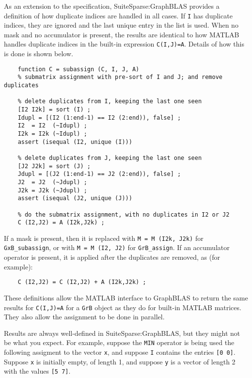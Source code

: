 \documentclass[12pt]{article}
\begin{document}
As an extension to the specification, SuiteSparse:GraphBLAS provides a
definition of how duplicate indices are handled in all cases.  If \verb'I' has
duplicate indices, they are ignored and the last unique entry in the list is
used.  When no mask and no accumulator is present, the results are identical to
how MATLAB handles duplicate indices in the built-in expression
\verb'C(I,J)=A'.  Details of how this is done is shown below.

{\small
\begin{verbatim}
    function C = subassign (C, I, J, A)
    % submatrix assignment with pre-sort of I and J; and remove duplicates

    % delete duplicates from I, keeping the last one seen
    [I2 I2k] = sort (I) ;
    Idupl = [(I2 (1:end-1) == I2 (2:end)), false] ;
    I2  = I2  (~Idupl) ;
    I2k = I2k (~Idupl) ;
    assert (isequal (I2, unique (I)))

    % delete duplicates from J, keeping the last one seen
    [J2 J2k] = sort (J) ;
    Jdupl = [(J2 (1:end-1) == J2 (2:end)), false] ;
    J2  = J2  (~Jdupl) ;
    J2k = J2k (~Jdupl) ;
    assert (isequal (J2, unique (J)))

    % do the submatrix assignment, with no duplicates in I2 or J2
    C (I2,J2) = A (I2k,J2k) ;
\end{verbatim}}

If a mask is present, then it is replaced with \verb'M = M (I2k, J2k)' for
\verb'GxB_subassign', or with \verb'M = M (I2, J2)' for \verb'GrB_assign'.
If an accumulator operator is present, it is applied after the duplicates
are removed, as (for example):

{\small
\begin{verbatim}
    C (I2,J2) = C (I2,J2) + A (I2k,J2k) ;
\end{verbatim}}

These definitions allow the MATLAB interface to GraphBLAS to return the same
results for \verb'C(I,J)=A' for a \verb'GrB' object as they do for built-in
MATLAB matrices.  They also allow the assignment to be done in parallel.

Results are always well-defined in SuiteSparse:GraphBLAS, but they might not be
what you expect.  For example, suppose the \verb'MIN' operator is being used
the following assigment to the vector \verb'x', and suppose \verb'I' contains
the entries \verb'[0 0]'.  Suppose \verb'x' is initially empty, of length 1,
and suppose \verb'y' is a vector of length 2 with the values \verb'[5 7]'.
\end{document}
